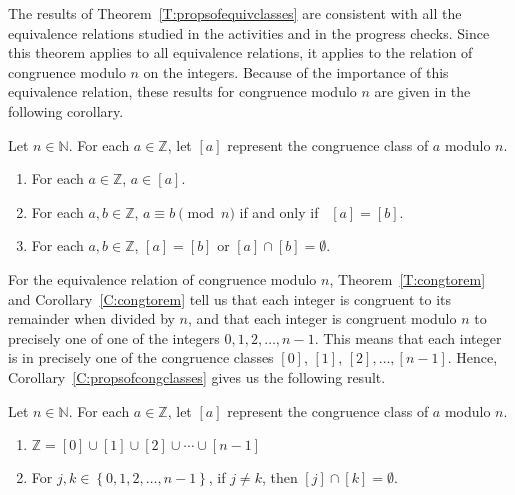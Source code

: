 The results of Theorem~\ref{T:propsofequivclasses} are consistent with all the equivalence relations studied in the \typel activities and in the progress checks.  Since this theorem applies to all equivalence relations, it applies to the relation of congruence modulo  $n$  on the integers.  Because of the importance of this equivalence relation, these results for congruence modulo  $n$  are given in the following corollary.

\begin{corollary}\label{C:propsofcongclasses}
Let  $n \in \mathbb{N}$.  For each  $a \in \mathbb{Z}$, let  $[ a ]$ represent the congruence class of  $a$  modulo  $n$.
\begin{enumerate}
\item For each  $a \in \mathbb{Z}$,  $a \in [ a ]$.

\item For each  $a, b \in \mathbb{Z}$, $ a \equiv  b \pmod n$ if and only if \,  $[ a ] = [ b ]$.

\item For each  $a, b \in \mathbb{Z}$, $[ a ] = [ b ]$  or  
$[ a ] \cap [ b ] = \emptyset $.
\end{enumerate}
\end{corollary}

For the equivalence relation of congruence modulo  $n$, Theorem~\ref{T:congtorem} and Corollary~\ref{C:congtorem}  tell us that each integer is congruent to its remainder when divided by  $n$, and that each integer is congruent modulo  $n$  to precisely one of one of the integers  $0, 1, 2,  \ldots , n - 1$.  This means that each integer is in precisely one of the congruence classes  $[ 0 ]$, $[ 1 ]$, $[ 2 ],  \ldots , [ {n - 1} ]$.   Hence, Corollary~\ref{C:propsofcongclasses} gives us the following result.

\begin{corollary}\label{C:propsofcongclasses2}
Let  $n \in \mathbb{N}$.  For each  $a \in \mathbb{Z}$, let  $[ a ]$ represent the congruence class of  $a$  modulo  $n$.
\begin{enumerate}
\item $\mathbb{Z} = [ 0 ] \cup [ 1 ] \cup [ 2 ] \cup   \cdots  \cup  [ {n - 1} ]$

\item For $j, k \in \left\{ {0, 1, 2,  \ldots , n - 1} \right\}$, if  $j \ne k$, then  
$[ j ] \cap [ k ] = \emptyset $.
\end{enumerate}
\end{corollary}
%
\hbreak
%

\endinput
